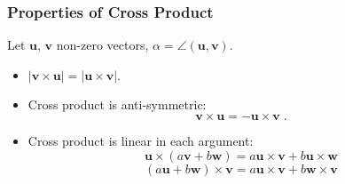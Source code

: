 \begin{frame}
 \frametitle{Properties of Cross Product}
Let $\textbf{u}$, $\textbf{v}$ non-zero vectors, $\alpha = \angle(\textbf{u},\textbf{v})$.


\begin{itemize}
\item<2-> $|\textbf{v} \times \textbf{u}|  = | \textbf{u} \times \textbf{v}|$.


\item<4-> Cross product is anti-symmetric:
$$\textbf{v} \times \textbf{u} = - \textbf{u} \times \textbf{v} \; .$$
\item<5-> Cross product is linear in each argument:
%
$$ \textbf{u} \times (a\textbf{v} + b\textbf{w}) =
a \textbf{u} \times \textbf{v} + b \textbf{u} \times \textbf{w}$$
%
$$(a\textbf{u} + b\textbf{w}) \times \textbf{v} =
a \textbf{u} \times \textbf{v} + b \textbf{w} \times \textbf{v}$$
\end{itemize}

\end{frame}

